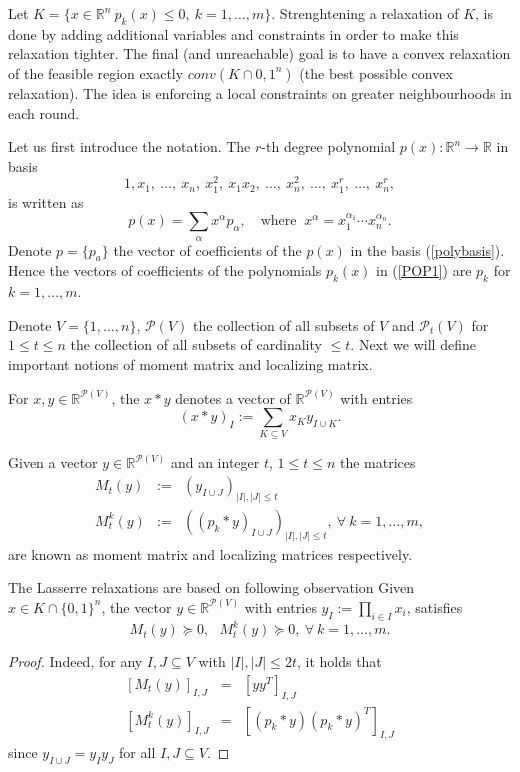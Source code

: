 \documentclass[12pt]{book}
\theoremstyle{definition}
\begin{document}
Let $K = \{ x\in \mathbb{R}^n \ p_k(x)\leq 0, \ k=1,\dots ,m \}$. Strenghtening a relaxation of $K$, is done by adding additional variables and constraints in order to make this relaxation tighter. The final (and unreachable) goal is to have a convex relaxation of the feasible region exactly $conv(K \cap {0,1}^n)$ (the best possible convex relaxation).  The idea is enforcing a local constraints on greater neighbourhoods in each round. 

Let us first introduce the notation. The $r$-th degree polynomial $p(x):\mathbb{R}^n\rightarrow\mathbb{R}$ in basis 
\begin{equation}
\label{polybasis}
1,x_1,\ \dots ,\ x_n,\ x_1^2,\ x_1x_2,\ \dots ,\ x_n^2,\ \dots ,\ x_1^r,\ \dots ,\ x_n^r,
\end{equation}
is written as 
$$p(x) = \sum_\alpha x^\alpha p_\alpha, \ \ \ \mbox{ where } \ x^\alpha = x_1^{\alpha_1}\cdots x_n^{\alpha_n}. $$
Denote $p = \{p_a\}$ the vector of coefficients of the $p(x)$ in the basis (\ref{polybasis}). Hence the vectors of coefficients of the polynomials $p_k(x)$ in (\ref{POP1}) are $p_k$ for $k=1,\dots ,m$.

Denote $V = \{ 1,\dots ,n\}$,  $\mathcal{P}(V)$ the collection of all subsets of $V$ and $\mathcal{P}_t(V)$ for $1\leq t\leq n$ the collection of all subsets of cardinality $\leq t$. 
Next we will define important notions of moment matrix and localizing matrix.


For $x,y\in \mathbb{R}^{\mathcal{P}(V)}$, the $x*y$ denotes a vector of $\mathbb{R}^{\mathcal{P}(V)}$
with entries 
\begin{equation}
(x*y)_I := \sum_{K\subseteq V} x_K y_{I\cup K}.
\end{equation}

Given a vector $y\in \mathbb{R}^{\mathcal{P}(V)}$  and an integer $t$, $1\leq t\leq n$
the matrices \begin{eqnarray}
M_t(y) &:=& (y_{I\cup J})_{\vert I\vert ,\vert J\vert \leq t} \\
M_t^k(y) &:=& \left((p_k*y)_{I\cup J}\right)_{\vert I\vert ,\vert J\vert \leq t} , \ \forall \ k=1,\dots ,m,
\end{eqnarray}
are known as moment matrix and localizing matrices respectively.

The Lasserre relaxations are based on following observation
\lema Given $x\in K\cap \{ 0,1\}^n$, the vector $y\in \mathbb{R}^{\mathcal{P}(V)}$ with entries $y_I:=\prod_{i\in I} x_i$, satisfies $$M_t(y)\succeq 0, \ \ \ M_t^k(y)\succeq 0, \ \forall \ k=1,\dots ,m.$$
\rm
\begin{proof}
Indeed, for any $I,J\subseteq V$ with $\vert I\vert, \vert J\vert \leq 2t$, it holds that
\begin{eqnarray*}
\left[M_t(y)\right]_{I,J} &=& [yy^T]_{I,J} \\
\left[M_t^k(y)\right]_{I,J} &=& \left[(p_k*y)(p_k*y)^T\right]_{I,J}
\end{eqnarray*}
since $y_{I\cup J} = y_I y_J$ for all $I,J\subseteq V$. 
\end{proof}
\end{document}
